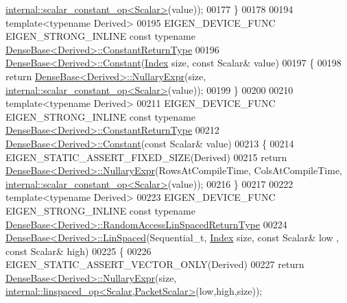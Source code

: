 \begin{DoxyCode}
      \hyperlink{struct_eigen_1_1internal_1_1scalar__constant__op}{internal::scalar\_constant\_op<Scalar>}(value));
00177 \}
00178 
00194 \textcolor{keyword}{template}<\textcolor{keyword}{typename} Derived>
00195 EIGEN\_DEVICE\_FUNC EIGEN\_STRONG\_INLINE \textcolor{keyword}{const} \textcolor{keyword}{typename} 
      \hyperlink{group___core___module_class_eigen_1_1_cwise_nullary_op}{DenseBase<Derived>::ConstantReturnType}
00196 \hyperlink{group___core___module_ab0ae1bfa72faedcaf53af81ca76c446b}{DenseBase<Derived>::Constant}(\hyperlink{namespace_eigen_a62e77e0933482dafde8fe197d9a2cfde}{Index} size, \textcolor{keyword}{const} Scalar& value)
00197 \{
00198   \textcolor{keywordflow}{return} \hyperlink{group___core___module_class_eigen_1_1_dense_base}{DenseBase<Derived>::NullaryExpr}(size, 
      \hyperlink{struct_eigen_1_1internal_1_1scalar__constant__op}{internal::scalar\_constant\_op<Scalar>}(value));
00199 \}
00200 
00210 \textcolor{keyword}{template}<\textcolor{keyword}{typename} Derived>
00211 EIGEN\_DEVICE\_FUNC EIGEN\_STRONG\_INLINE \textcolor{keyword}{const} \textcolor{keyword}{typename} 
      \hyperlink{group___core___module_class_eigen_1_1_cwise_nullary_op}{DenseBase<Derived>::ConstantReturnType}
00212 \hyperlink{group___core___module_ab0ae1bfa72faedcaf53af81ca76c446b}{DenseBase<Derived>::Constant}(\textcolor{keyword}{const} Scalar& value)
00213 \{
00214   EIGEN\_STATIC\_ASSERT\_FIXED\_SIZE(Derived)
00215   \textcolor{keywordflow}{return} \hyperlink{group___core___module_class_eigen_1_1_dense_base}{DenseBase<Derived>::NullaryExpr}(RowsAtCompileTime, 
      ColsAtCompileTime, \hyperlink{struct_eigen_1_1internal_1_1scalar__constant__op}{internal::scalar\_constant\_op<Scalar>}(value));
00216 \}
00217 
00222 \textcolor{keyword}{template}<\textcolor{keyword}{typename} Derived>
00223 EIGEN\_DEVICE\_FUNC EIGEN\_STRONG\_INLINE \textcolor{keyword}{const} \textcolor{keyword}{typename} 
      \hyperlink{group___core___module_class_eigen_1_1_cwise_nullary_op}{DenseBase<Derived>::RandomAccessLinSpacedReturnType}
00224 \hyperlink{group___core___module_a35f222d8834f34fd358f2ef7bb52c888}{DenseBase<Derived>::LinSpaced}(Sequential\_t, \hyperlink{namespace_eigen_a62e77e0933482dafde8fe197d9a2cfde}{Index} size, \textcolor{keyword}{const} Scalar& low
      , \textcolor{keyword}{const} Scalar& high)
00225 \{
00226   EIGEN\_STATIC\_ASSERT\_VECTOR\_ONLY(Derived)
00227   \textcolor{keywordflow}{return} \hyperlink{group___core___module_class_eigen_1_1_dense_base}{DenseBase<Derived>::NullaryExpr}(size, 
      \hyperlink{struct_eigen_1_1internal_1_1linspaced__op}{internal::linspaced\_op<Scalar,PacketScalar>}(low,high,size));

\end{DoxyCode}
